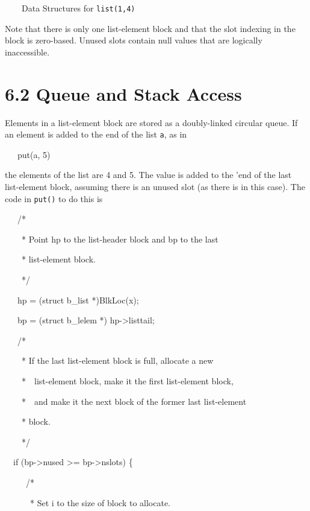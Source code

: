 \ \ \ \ Data Structures for \texttt{list(1,4)}


Note that there is only one list-element block and that the slot
indexing in the block is zero-based. Unused slots contain null values
that are logically inaccessible.

\section[6.2 Queue and Stack Access]{6.2 Queue and Stack Access}

Elements in a list-element block are stored as a doubly-linked
circular queue. If an element is added to the end of the list
\texttt{a}, as in

{\ttfamily\mdseries
\ \ \ put(a, 5)}

\noindent the elements of the list are 4 and 5. The value is added to
the '{\textquotedbl}end{\textquotedbl} of the last list-element block,
assuming there is an unused slot (as there is in this case). The code
in \texttt{put()} to do this is

{\ttfamily\mdseries
\ \ \ /*}

{\ttfamily\mdseries
\ \ \ \ * Point hp to the list-header block and bp to the last}

{\ttfamily\mdseries
\ \ \ \ * list-element block.}

{\ttfamily\mdseries
\ \ \ \ */}

{\ttfamily\mdseries
\ \ \ hp = (struct b\_list *)BlkLoc(x);}

{\ttfamily\mdseries
\ \ \ bp = (struct b\_lelem *) hp-{\textgreater}listtail;}

{\ttfamily\mdseries
\ \ \ /*}

{\ttfamily\mdseries
\ \ \ \ * If the last list-element block is full, allocate a new}

{\ttfamily\mdseries
\ \ \ \ *\ \ list-element block, make it the first list-element block,}

{\ttfamily\mdseries
\ \ \ \ *\ \ and make it the next block of the former last list-element}

{\ttfamily\mdseries
\ \ \ \ * block.}

{\ttfamily\mdseries
\ \ \ \ */}

{\ttfamily\mdseries
\ \  if (bp-{\textgreater}nused {\textgreater}= bp-{\textgreater}nslots) \{}

{\ttfamily\mdseries
\ \  \ \ \ /*}

{\ttfamily\mdseries
\ \  \ \ \ \ * Set i to the size of block to allocate.}

